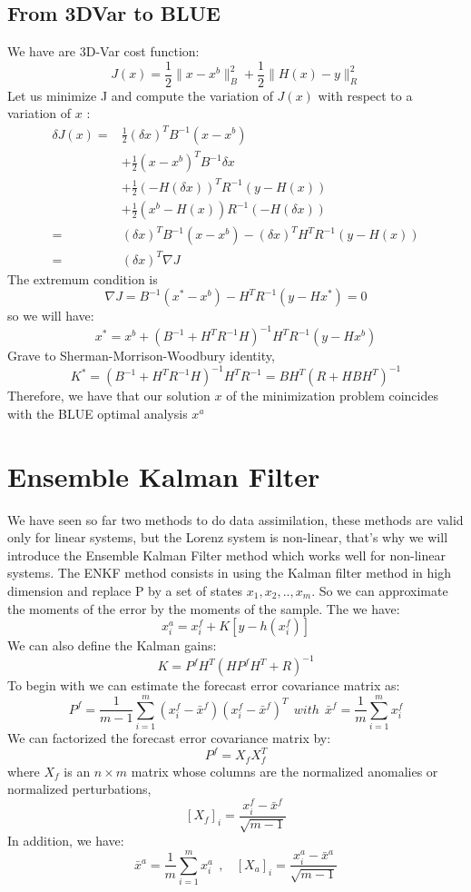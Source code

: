 \documentclass{article}
\begin{document}
\subsection{From 3DVar to BLUE}
\noindent We have are 3D-Var cost function:
$$J(x)=\frac{1}{2}\|x-x^b\|_B^2+\frac{1}{2}\|H(x)-y\|_{R}^2 $$
 Let us minimize J and compute the variation of $J(x)$ with respect to
a variation of $x$ :
$$\begin{aligned}
\delta J(x)=&\frac{1}{2}(\delta x)^TB^{-1}(x-x^b) \\
&+\frac{1}{2}(x-x^b)^TB^{-1}\delta x \\ &+\frac{1}{2}(-H(\delta x))^TR^{-1}(y-H(x)) \\
&+\frac{1}{2}(x^b-H(x))R^{-1}(-H(\delta x)) \\
=&(\delta x)^TB^{-1}(x-x^b)-(\delta x)^TH^TR^{-1}(y-H(x)) \\
=&(\delta x)^T \nabla J
\end{aligned}$$
The extremum condition is 
$$\nabla J=B^{-1}(x^*-x^b)-H^TR^{-1}(y-Hx^*)=0$$
so we will have:
$$x^*=x^b+(B^{-1}+H^TR^{-1}H)^{-1}H^TR^{-1}(y-Hx^b)$$
Grave to Sherman-Morrison-Woodbury identity,
$$K^*=(B^{-1}+H^TR^{-1}H)^{-1}H^TR^{-1}=BH^T(R+HBH^T)^{-1}$$
Therefore, we have that our solution $x$ of the minimization problem coincides with the BLUE optimal analysis $x^a$
\section{Ensemble Kalman Filter}
\noindent We have seen so far two methods to do data assimilation, these methods are valid only for linear systems, but the Lorenz system is non-linear, that's why we will introduce the Ensemble Kalman Filter method which works well for non-linear systems. The ENKF method consists in using the Kalman filter method in high dimension and replace P by a set of states $x_1,x_2,..,x_{m}$. So we can approximate the moments of the error by the moments of the sample.
The we have:
$$x_i^a=x_i^f+K[y-h(x_i^f)]$$
We can also define the Kalman gains: 
$$K=P^f H^T(HP^f H^T+R)^{-1}$$
To begin with we can estimate the
forecast error covariance matrix as:
$$P^f=\frac{1}{m-1}\sum_{i=1}^{m}(x_i^f-\bar{x}^f)(x_i^f-\bar{x}^f)^T~~with~~\bar{x}^f=\frac{1}{m}\sum_{i=1}^{m}x_i^f $$ 
We can factorized the forecast error covariance matrix by:
$$P^f=X_f X_f^T$$
where $X_f$ is an $n \times m$ matrix whose columns are the normalized anomalies or normalized perturbations,
$$[X_f]_i=\frac{x_i^f-\bar{x}^f}{\sqrt{m-1}}$$
In addition, we have:
$$
\bar{x}^a=\frac{1}{m}\sum_{i=1}^mx_i^a~~,~~~~[X_a]_i=\frac{x_i^a-\bar{x}^a}{\sqrt{m-1}} $$
\end{document}
